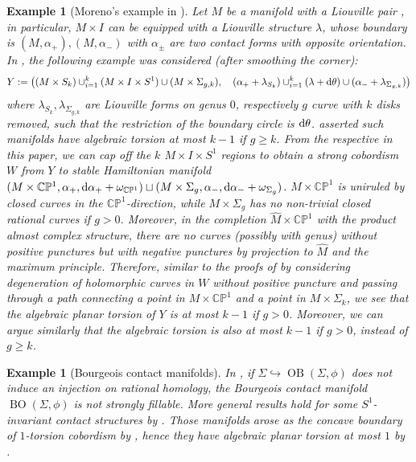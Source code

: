 \documentclass[11pt]{amsart}
\numberwithin{equation}{section}
\newtheorem{example}[theorem]{\textbf{Example}}
\newcommand{\CP}{\mathbb{C}\mathbb{P}}
\def\rd{{\rm d}}
\DeclareMathOperator{\OB}{OB}
\DeclareMathOperator{\BO}{BO}
\begin{document}
\begin{example}[Moreno's example in \cite{moreno2019algebraic}]
    Let $M$ be a manifold with a Liouville pair \cite[Definition 1]{MNW}, in particular, $M\times I$ can be equipped with a Liouville structure $\lambda$, whose boundary is $(M,\alpha_+),(M,\alpha_-)$ with $\alpha_{\pm}$ are two contact forms with opposite orientation. In \cite{moreno2019algebraic}, the following example was considered (after smoothing the corner):
    $$Y:=\left((M\times S_k) \cup_{i=1}^k (M\times I \times S^1) \cup (M\times \Sigma_{g,k}), \quad (\alpha_++\lambda_{S_k})\cup_{i=1}^k(\lambda+\rd\theta) \cup(\alpha_-+\lambda_{\Sigma_{g,k}})
    \right)$$
    where $\lambda_{S_k},\lambda_{\Sigma_{g,k}}$ are Liouville forms on genus $0$, respectively $g$ curve with $k$ disks removed, such that the restriction of the boundary circle is $\rd \theta$. \cite[Theorem 1.3]{moreno2019algebraic} asserted such manifolds have algebraic torsion at most $k-1$ if $g\ge k$. From the respective in this paper, we can cap off the $k$ $M\times I \times S^1$ regions to obtain a strong cobordism $W$ from $Y$ to stable Hamiltonian manifold $(M\times \CP^1,\alpha_+,\rd\alpha_++\omega_{\CP^1})\sqcup (M\times \Sigma_g,\alpha_-,\rd\alpha_-+\omega_{\Sigma_g})$. $M\times \CP^1$ is uniruled by closed curves in the $\CP^1$-direction, while $M\times \Sigma_g$ has no non-trivial closed rational curves if $g>0$. Moreover, in the completion $\widehat{M}\times \CP^1$ with the product almost complex structure, there are no curves (possibly with genus) without positive punctures but with negative punctures by projection to $\widehat{M}$ and the maximum principle. Therefore, similar to the proofs of  by considering degeneration of holomorphic curves in $W$ without positive puncture and passing through a path connecting a point in $M\times \CP^1$ and a point in $M\times \Sigma_k$, we see that the algebraic planar torsion of $Y$ is at most $k-1$ if $g>0$. Moreover, we can argue similarly that the algebraic torsion is also at most $k-1$ if $g>0$, instead of $g\ge k$.
\end{example}

\begin{example}[Bourgeois contact manifolds]
    In \cite[Theorem C]{BGM}, if $\Sigma \hookrightarrow \OB(\Sigma,\phi)$ does not induce an injection on rational homology, the Bourgeois contact manifold $\BO(\Sigma,\phi)$ is not strongly fillable. More general results hold for some $S^1$-invariant contact structures by \cite[Theorem B]{BGM}. Those manifolds arose as the concave boundary of $1$-torsion cobordism by , hence they have algebraic planar torsion at most $1$ by . 
\end{example}
\end{document}
